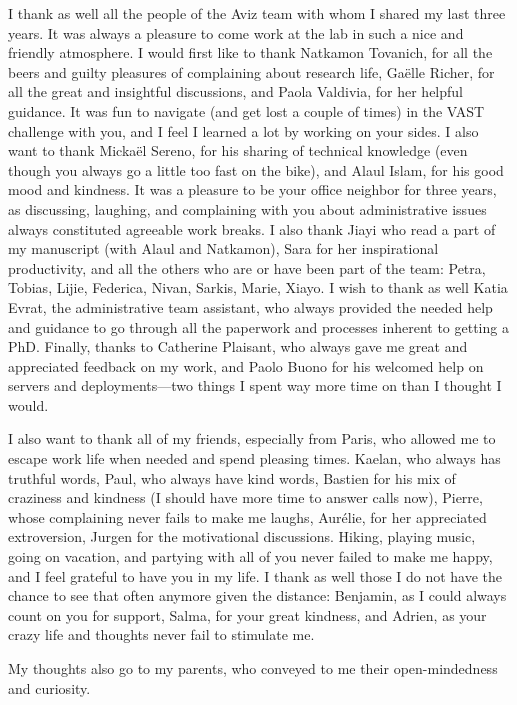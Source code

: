 I thank as well all the people of the Aviz team with whom I shared my last three years. It was always a pleasure to come work at the lab in such a nice and friendly atmosphere.
I would first like to thank Natkamon Tovanich, for all the beers and guilty pleasures of complaining about research life, Gaëlle Richer, for all the great and insightful discussions, and Paola Valdivia, for her helpful guidance.
It was fun to navigate (and get lost a couple of times) in the VAST challenge with you, and I feel I learned a lot by working on your sides.
I also want to thank Mickaël Sereno, for his sharing of technical knowledge (even though you always go a little too fast on the bike), and Alaul Islam, for his good mood and kindness. It was a pleasure to be your office neighbor for three years, as discussing, laughing, and complaining with you about administrative issues always constituted agreeable work breaks.
I also thank Jiayi who read a part of my manuscript (with Alaul and Natkamon), Sara for her inspirational productivity, and all the others who are or have been part of the team: Petra, Tobias, Lijie, Federica, Nivan, Sarkis, Marie, Xiayo.
I wish to thank as well Katia Evrat, the administrative team assistant, who always provided the needed help and guidance to go through all the paperwork and processes inherent to getting a PhD.
Finally, thanks to Catherine Plaisant, who always gave me great and appreciated feedback on my work, and Paolo Buono for his welcomed help on servers and deployments---two things I spent way more time on than I thought I would.


I also want to thank all of my friends, especially from Paris, who allowed me to escape work life when needed and spend pleasing times.
Kaelan, who always has truthful words, Paul, who always have kind words, Bastien for his mix of craziness and kindness (I should have more time to answer calls now), Pierre, whose complaining never fails to make me laughs, Aurélie, for her appreciated extroversion, Jurgen for the motivational discussions.
Hiking, playing music, going on vacation, and partying with all of you never failed to make me happy, and I feel grateful to have you in my life.
I thank as well those I do not have the chance to see that often anymore given the distance: Benjamin, as I could always count on you for support, Salma, for your great kindness, and Adrien, as your crazy life and thoughts never fail to stimulate me.


My thoughts also go to my parents, who conveyed to me their open-mindedness and curiosity.

